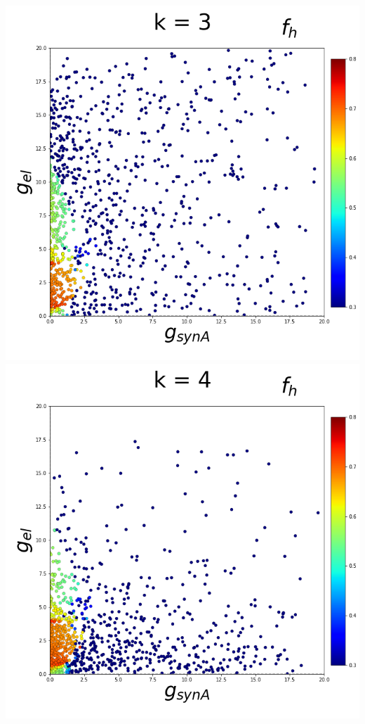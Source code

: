 \documentclass[11pt]{article}
\begin{document}
\begin{center}
\includegraphics[scale=0.125]{DSN_figs/STGCircuit_DSN_c=0_rs=1_k=3.png}
\includegraphics[scale=0.125]{DSN_figs/STGCircuit_DSN_c=0_rs=1_k=4.png}

\end{center}
\end{document}
